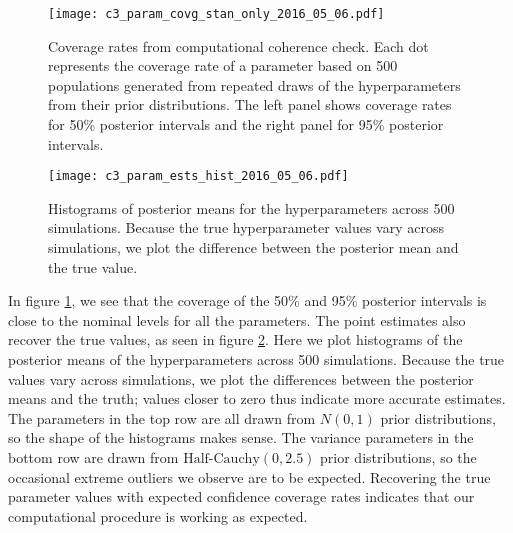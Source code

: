 \documentclass[12pt,a4paper]{article}
\begin{document}
\begin{figure}
	\centering
	\texttt{[image: c3\_param\_covg\_stan\_only\_2016\_05\_06.pdf]}
	\caption{Coverage rates from computational coherence check. Each dot represents the coverage rate of a parameter based on 500 populations generated from repeated draws of the hyperparameters from their prior distributions. The left panel shows coverage rates for 50\% posterior intervals and the right panel for 95\% posterior intervals.}
	\label{fig:c3_param_covg}
\end{figure}

\begin{figure}
	\centering
	\texttt{[image: c3\_param\_ests\_hist\_2016\_05\_06.pdf]}
	\caption{Histograms of posterior means for the hyperparameters across 500 simulations. Because the true hyperparameter values vary across simulations, we plot the difference between the posterior mean and the true value.}
	\label{fig:c3_param_hists}
\end{figure}

In figure \ref{fig:c3_param_covg}, we see that the coverage of the 50\% and 95\% posterior intervals is close to the nominal levels for all the parameters. The point estimates also recover the true values, as seen in figure \ref{fig:c3_param_hists}. Here we plot histograms of the posterior means of the hyperparameters across 500 simulations. Because the true values vary across simulations, we plot the differences between the posterior means and the truth; values closer to zero thus indicate more accurate estimates. The parameters in the top row are all drawn from $N(0,1)$ prior distributions, so the shape of the histograms makes sense. The variance parameters in the bottom row are drawn from $\text{Half-Cauchy}(0, 2.5)$ prior distributions, so the occasional extreme outliers we observe are to be expected. Recovering the true parameter values with expected confidence coverage rates indicates that our computational procedure is working as expected. 
\end{document}
